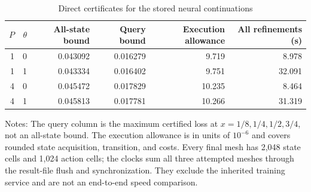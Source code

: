 \begin{table}[htbp]\centering\small
\caption{Direct certificates for the stored neural continuations}\label{tab:r41direct}
\begin{tabular}{rrrrrr}\toprule
$P$ & $\theta$ & All-state bound & Query bound & Execution allowance & All refinements (s)\\\midrule
1 & 0 & 0.043092 & 0.016279 & 9.719 & 8.978\\
1 & 1 & 0.043334 & 0.016402 & 9.751 & 32.091\\
4 & 0 & 0.045472 & 0.017829 & 10.235 & 8.464\\
4 & 1 & 0.045813 & 0.017781 & 10.266 & 31.319\\
\bottomrule\end{tabular}
\par\smallskip\begin{minipage}{.97\textwidth}\footnotesize Notes: The query column is the maximum certified loss at $x=1/8,1/4,1/2,3/4$, not an all-state bound. The execution allowance is in units of $10^{-6}$ and covers rounded state acquisition, transition, and costs. Every final mesh has 2,048 state cells and 1,024 action cells; the clocks sum all three attempted meshes through the result-file flush and synchronization. They exclude the inherited training service and are not an end-to-end speed comparison.\end{minipage}\end{table}

